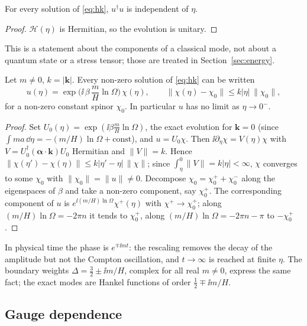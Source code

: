 \begin{lemma}
\label{lem:norm}
For every solution of \eqref{eq:hk}, $u^{\dagger}u$ is independent of $\eta$.
\end{lemma}
\begin{proof}
$\mathcal{H}(\eta)$ is Hermitian, so the evolution is unitary.
\end{proof}

This is a statement about the components of a classical mode, not about a quantum state or a stress tensor; those are treated in Section~\ref{sec:energy}.

\begin{proposition}
\label{prop:dirac}
Let $m\neq0$, $k=|\mathbf{k}|$. Every non-zero solution of \eqref{eq:hk} can be written
\begin{equation}
u(\eta)=\exp\!\Big(\ii\,\beta\,\frac{m}{H}\ln\Omega\Big)\,\chi(\eta),\qquad \|\chi(\eta)-\chi_{0}\|\le k|\eta|\,\|\chi_{0}\|,
\label{eq:structure}
\end{equation}
for a non-zero constant spinor $\chi_{0}$. In particular $u$ has no limit as $\eta\to0^{-}$.
\end{proposition}
\begin{proof}
Set $U_{0}(\eta)=\exp(\ii\beta\frac{m}{H}\ln\Omega)$, the exact evolution for $\mathbf{k}=0$ (since $\int m a\,\dd\eta=-(m/H)\ln\Omega+\text{const}$), and $u=U_{0}\chi$. Then $\ii\partial_{\eta}\chi=V(\eta)\chi$ with $V=U_{0}^{\dagger}(\boldsymbol\alpha\cdot\mathbf{k})U_{0}$ Hermitian and $\|V\|=k$. Hence $\|\chi(\eta')-\chi(\eta)\|\le k|\eta'-\eta|\,\|\chi\|$; since $\int_{\eta}^{0}\|V\|=k|\eta|<\infty$, $\chi$ converges to some $\chi_{0}$ with $\|\chi_{0}\|=\|u\|\neq0$. Decompose $\chi_{0}=\chi_{0}^{+}+\chi_{0}^{-}$ along the eigenspaces of $\beta$ and take a non-zero component, say $\chi_{0}^{+}$. The corresponding component of $u$ is $e^{\ii(m/H)\ln\Omega}\chi^{+}(\eta)$ with $\chi^{+}\to\chi_{0}^{+}$; along $(m/H)\ln\Omega=-2\pi n$ it tends to $\chi_{0}^{+}$, along $(m/H)\ln\Omega=-2\pi n-\pi$ to $-\chi_{0}^{+}$.
\end{proof}

In physical time the phase is $e^{\mp\ii mt}$: the rescaling removes the decay of the amplitude but not the Compton oscillation, and $t\to\infty$ is reached at finite $\eta$. The boundary weights $\Delta=\tfrac32\pm\ii m/H$, complex for all real $m\neq0$, express the same fact; the exact modes are Hankel functions of order $\tfrac12\mp\ii m/H$.

\subsection{Gauge dependence}
\label{sec:gauge}

